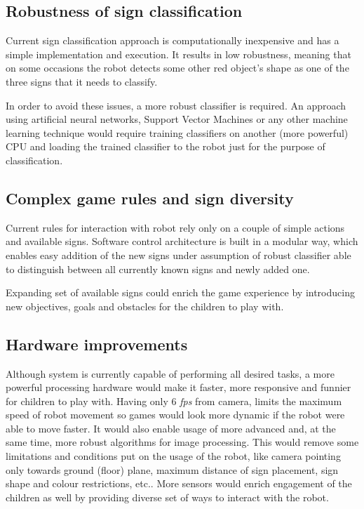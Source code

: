 
\subsection{Robustness of sign classification}

Current sign classification approach is computationally inexpensive and has a simple implementation and execution. It results in low robustness, meaning that on some occasions the robot detects some other red object's shape as one of the three signs that it needs to classify.

In order to avoid these issues, a more robust classifier is required. An approach using artificial neural networks, Support Vector Machines or any other machine learning technique would require training classifiers on another (more powerful) CPU and loading the trained classifier to the robot just for the purpose of classification.

\subsection{Complex game rules and sign diversity}

Current rules for interaction with robot rely only on a couple of simple actions and available signs. Software control architecture is built in a modular way, which enables easy addition of the new signs under assumption of robust classifier able to distinguish between all currently known signs and newly added one.

Expanding set of available signs could enrich the game experience by introducing new objectives, goals and obstacles for the children to play with.

\subsection{Hardware improvements}

Although system is currently capable of performing all desired tasks, a more powerful processing hardware would make it faster, more responsive and funnier for children to play with. Having only 6 \textit{fps} from camera, limits the maximum speed of robot movement so games would look more dynamic if the robot were able to move faster. 
It would also enable usage of more advanced and, at the same time, more robust algorithms for image processing. This would remove some limitations and conditions put on the usage of the robot, like camera pointing only towards ground (floor) plane, maximum distance of sign placement, sign shape and colour restrictions, etc..
More sensors would enrich engagement of the children as well by providing diverse set of ways to interact with the robot. 


